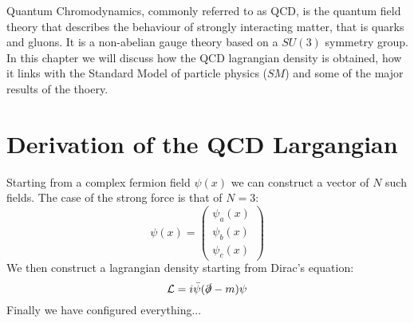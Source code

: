 Quantum Chromodynamics, commonly referred to as QCD, is the quantum field theory that describes the behaviour of strongly interacting matter, that is quarks and gluons. It is a non-abelian gauge theory based on a $SU(3)$ symmetry group. In this chapter we will discuss how the QCD lagrangian density is obtained, how it links with the Standard Model of particle physics ($SM$) and some of the major results of the thoery. \cite{peskin}

\section{Derivation of the QCD Largangian}
Starting from a complex fermion field $\psi(x)$ we can construct a vector of $N$ such fields. The case of the strong force is that of $N=3$:
\begin{equation}
  \psi(x) = \begin{pmatrix}
      \psi_a(x)\\
      \psi_b(x)\\
      \psi_c(x)
  \end{pmatrix}
\end{equation}
We then construct a lagrangian density starting from Dirac's equation:
\begin{equation}
  \mathcal{L} = i\bar{\psi}(\slashed{\partial} - m )\psi
\end{equation}
Finally we have configured everything...
